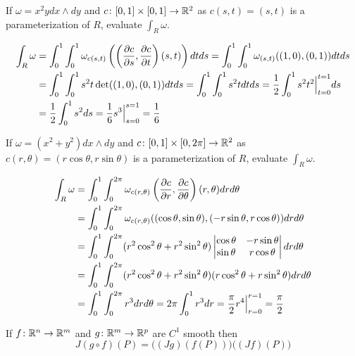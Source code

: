 \documentclass[notes]{subfiles}
\begin{document}
\begin{exercise}
    If $\omega = x^2 y dx \wedge dy$ and $c\colon [0, 1] \times [0, 1] \to \mathbb{R}^2$ as $c(s, t) = (s, t)$ is a parameterization of $R$, evaluate $\int_R \omega$.
\end{exercise}
\begin{solution}
    \begin{align*}
        \int_R \omega
        &= \int_0^1 \int_0^1 \omega_{c(s, t)}\left( \left(\frac{\partial c}{\partial s}, \frac{\partial c}{\partial t}\right)(s, t) \right)dtds
        = \int_0^1 \int_0^1 \omega_{(s, t)}((1, 0), (0, 1))dtds \\
        &= \int_0^1 \int_0^1 s^2 t \det((1, 0), (0, 1)) dtds
        = \int_0^1 \int_0^1 s^2 t dtds
        = \frac{1}{2} \int_0^1 s^2 t^2\Big|_{t = 0}^{t = 1} ds \\
        &= \frac{1}{2} \int_0^1 s^2 ds
        = \frac{1}{6} s^3\Big|_{s = 0}^{s = 1}
        = \frac{1}{6}
    \end{align*}
\end{solution}

\begin{exercise}
    If $\omega = (x^2 + y^2)dx\wedge dy$ and $c\colon [0, 1] \times [0, 2\pi] \to \mathbb{R}^2$ as $c(r, \theta) = (r\cos \theta, r\sin \theta)$ is a parameterization of $R$, evaluate $\int_R \omega$.
\end{exercise}
\begin{solution}
    {\allowdisplaybreaks
    \begin{align*}
        \int_R \omega
        &= \int_0^1 \int_0^{2\pi} \omega_{c(r, \theta)}\left( \frac{\partial c}{\partial r}, \frac{\partial c}{\partial \theta} \right)(r, \theta) drd\theta \\
        &= \int_0^1 \int_0^{2\pi} \omega_{c(r, \theta)}( (\cos\theta, \sin\theta), (-r\sin\theta, r\cos\theta) )drd\theta \\
        &= \int_0^1 \int_0^{2\pi} (r^2\cos^2\theta + r^2\sin^2\theta)\begin{vmatrix}
            \cos \theta & -r\sin\theta \\
            \sin \theta & r\cos\theta
        \end{vmatrix}drd\theta \\
        &= \int_0^1 \int_0^{2\pi} (r^2\cos^2\theta + r^2\sin^2\theta)(r\cos^2\theta + r\sin^2\theta)drd\theta \\
        &= \int_0^1 \int_0^{2\pi} r^3 drd\theta
        = 2\pi\int_0^1 r^3 dr
        = \frac{\pi}{2} r^4\Big|_{r = 0}^{r = 1}
        = \frac{\pi}{2}
    \end{align*}
    }
\end{solution}

\begin{theorem}
    If $f\colon \mathbb{R}^n \to \mathbb{R}^m$ and $g\colon \mathbb{R}^m \to \mathbb{R}^p$ are $C^1$ smooth then
    \[
        J(g \circ f)(P) = \Big((Jg)(f(P)) \Big) \Big( (Jf) (P) \Big)
    \]
\end{theorem}

\end{document}
